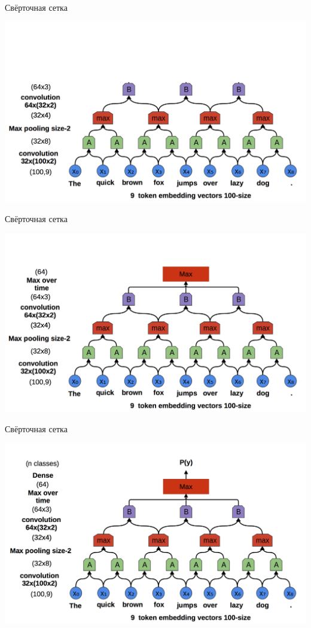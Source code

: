 \documentclass[notes,12pt, aspectratio=169]{beamer}
\begin{document}
\begin{frame}{Свёрточная сетка}
\begin{center}
	\includegraphics[width=.75\linewidth]{conv3.png}
\end{center}
\end{frame} 


\begin{frame}{Свёрточная сетка}
\begin{center}
	\includegraphics[width=.75\linewidth]{conv4.png}
\end{center}
\end{frame} 


\begin{frame}{Свёрточная сетка}
\begin{center}
	\includegraphics[width=.75\linewidth]{conv5.png}
\end{center}
\end{frame} 
\end{document}
